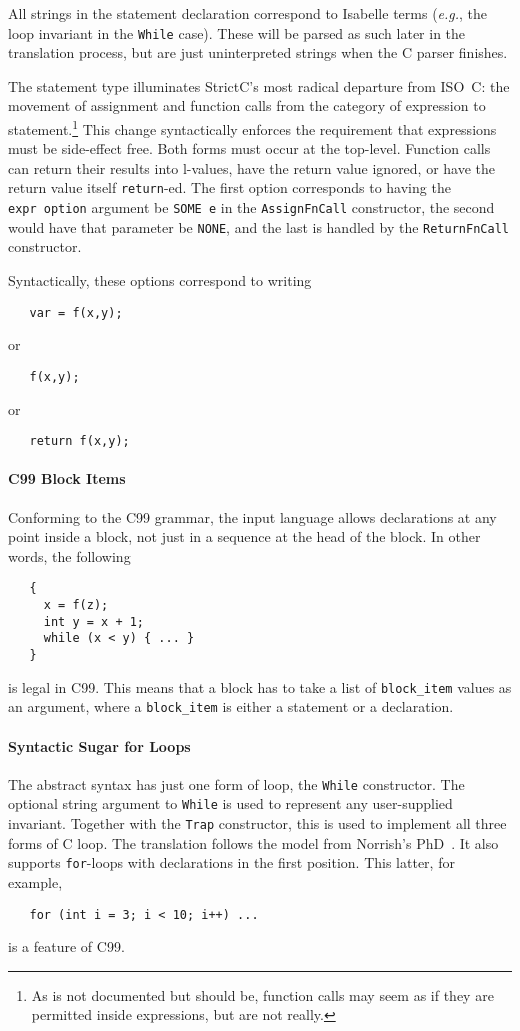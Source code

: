 \documentclass{article}
\newcommand{\strictc}{\textsf{StrictC}}
\newcommand{\eg}{\textit{e.g.}}
\begin{document}
All strings in the statement declaration correspond to Isabelle terms
(\eg, the loop invariant in the \texttt{While} case).
These will be parsed as such later in the translation
process, but are just uninterpreted strings when the C parser
finishes.

The statement type illuminates \strictc's most radical departure from
ISO~C: the movement of assignment and function calls from the category
of expression to statement.\footnote{As is not documented but should be, function calls may seem
  as if they are permitted inside expressions, but are not really.}
This change syntactically enforces the requirement that expressions must be
side-effect free.  Both forms must occur at the top-level.  Function
calls can return their results into l-values, have the return value
ignored, or have the return value itself \texttt{return}-ed.  The
first option corresponds to having the \texttt{expr~option} argument be
\texttt{SOME~e} in the \texttt{AssignFnCall} constructor, the second
would have that parameter be \texttt{NONE}, and the last is handled by
the \texttt{ReturnFnCall} constructor.

Syntactically, these options correspond to writing
\begin{verbatim}
   var = f(x,y);
\end{verbatim}
or
\begin{verbatim}
   f(x,y);
\end{verbatim}
or
\begin{verbatim}
   return f(x,y);
\end{verbatim}

\paragraph{C99 Block Items}
Conforming to the C99 grammar, the input language allows declarations
at any point inside a block, not just in a sequence at the head of the
block.  In other words, the following
\begin{verbatim}
   {
     x = f(z);
     int y = x + 1;
     while (x < y) { ... }
   }
\end{verbatim}
is legal in C99.  This means that a block has
to take a list of \texttt{block_item} values as an argument, where a
\texttt{block_item} is either a statement or a declaration.

\paragraph{Syntactic Sugar for Loops}
The abstract syntax has just one form of loop, the \texttt{While}
constructor.  The optional string argument to \texttt{While} is used
to represent any user-supplied invariant.  Together with the
\texttt{Trap} constructor, this is used to implement all three forms
of C loop.  The translation follows the model from Norrish's
PhD~\cite[p60]{norrish98}.  It also supports \texttt{for}-loops with
declarations in the first position.  This latter, for example,
\begin{verbatim}
   for (int i = 3; i < 10; i++) ...
\end{verbatim}
is a feature of C99.
\end{document}
